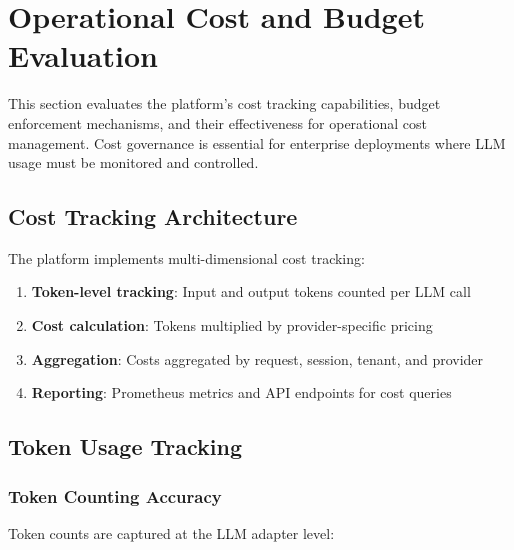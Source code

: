 
\section{Operational Cost and Budget Evaluation}
\label{sec:cost-eval}

This section evaluates the platform's cost tracking capabilities, budget enforcement mechanisms, and their effectiveness for operational cost management. Cost governance is essential for enterprise deployments where LLM usage must be monitored and controlled.

\subsection{Cost Tracking Architecture}

The platform implements multi-dimensional cost tracking:

\begin{enumerate}
    \item \textbf{Token-level tracking}: Input and output tokens counted per LLM call
    \item \textbf{Cost calculation}: Tokens multiplied by provider-specific pricing
    \item \textbf{Aggregation}: Costs aggregated by request, session, tenant, and provider
    \item \textbf{Reporting}: Prometheus metrics and API endpoints for cost queries
\end{enumerate}

\subsection{Token Usage Tracking}

\subsubsection{Token Counting Accuracy}

Token counts are captured at the LLM adapter level:

